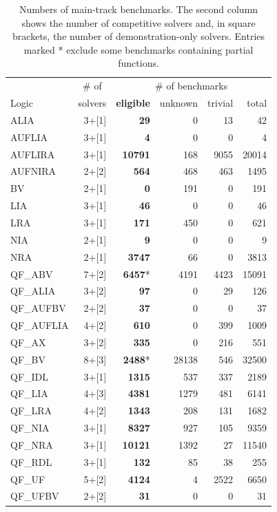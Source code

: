 \documentclass[twoside,11pt]{article}
\begin{document}
\begin{table}
\caption{Numbers of main-track benchmarks. The second column shows the number of competitive solvers and, in square brackets, the number of demonstration-only solvers. Entries marked * exclude some benchmarks containing partial functions.}
\label{Table:benchmarks}
\centering
\begin{tabular}{|l|r|r|r|r|r|}
\hline
       & \multicolumn{1}{|c|}{\# of} & \multicolumn{4}{|c|}{\# of benchmarks} \\
 Logic & solvers & {\bf eligible} & unknown  & trivial & total  \\
\hline
ALIA & 3+[1] & {\bf 29} & 0 & 13 & 42 \\
AUFLIA & 3+[1] & {\bf 4} & 0 & 0 & 4\\
AUFLIRA & 3+[1] & {\bf 10791} & 168 & 9055 & 20014 \\
AUFNIRA & 2+[2] & {\bf 564} & 468 & 463 & 1495 \\
BV & 2+[1] & {\bf 0} & 191 & 0 & 191 \\
LIA & 3+[1] & {\bf 46} & 0 & 0 & 46 \\
LRA & 3+[1] & {\bf 171} & 450 & 0 & 621\\
NIA & 2+[1] & {\bf 9} & 0 & 0 & 9\\
NRA & 2+[1] & {\bf 3747} & 66 & 0 & 3813 \\
QF\_ABV & 7+[2] & {\bf 6457}* & 4191 & 4423 & 15091 \\
QF\_ALIA & 3+[2] & {\bf 97} & 0 & 29 & 126 \\
QF\_AUFBV & 2+[2] & {\bf 37} & 0 & 0 & 37 \\
QF\_AUFLIA & 4+[2] & {\bf 610} & 0 & 399 & 1009\\
QF\_AX & 3+[2] & {\bf 335} & 0 & 216 & 551 \\
QF\_BV & 8+[3] & {\bf 2488}* & 28138 & 546 & 32500 \\
QF\_IDL & 3+[1] & {\bf 1315} & 537 & 337 & 2189 \\
QF\_LIA & 4+[3] & {\bf 4381} & 1279 & 481 & 6141 \\
QF\_LRA & 4+[2] & {\bf 1343} & 208 & 131 & 1682\\
QF\_NIA & 3+[1] & {\bf 8327} & 927 & 105 & 9359 \\
QF\_NRA & 3+[1] & {\bf 10121} & 1392 & 27 & 11540 \\
QF\_RDL & 3+[1] & {\bf 132} & 85 & 38 & 255 \\
QF\_UF & 5+[2] & {\bf 4124} & 4 & 2522 & 6650 \\
QF\_UFBV & 2+[2] & {\bf 31} & 0 & 0 & 31 \\

\end{tabular}
\end{table}
\end{document}
